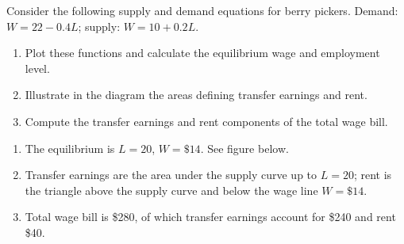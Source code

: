 \begin{enumialphparenastyle}
\begin{ex}\label{ex:ch12ex4}
Consider the following supply and demand equations for berry pickers. Demand: $W=22-0.4L$; supply: $W=10+0.2L$.
\begin{enumerate}
	\item	Plot these functions and calculate the equilibrium wage and employment level.
	\item	Illustrate in the diagram the areas defining transfer earnings and rent.
	\item	Compute the transfer earnings and rent components of the total wage bill.
\end{enumerate}
\begin{sol}
\begin{enumerate}
	\item	The equilibrium is $L=20$, $W=\$14$. See figure below.
	\item	Transfer earnings are the area under the supply curve up to $L=20$; rent is the triangle above the supply curve and below the wage line $W=\$14$.
	\item	Total wage bill is \$280, of which transfer earnings account for \$240 and rent \$40.
\end{enumerate}
\begin{center}
\end{center}
\end{sol}
\end{ex}


\end{enumialphparenastyle}
